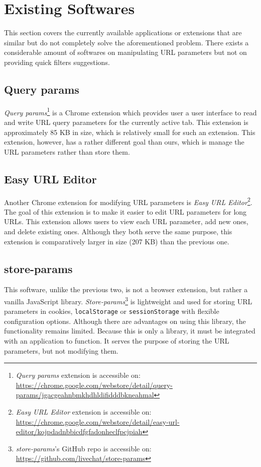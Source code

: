 \section{Existing Softwares}
This section covers the currently available applications or extensions that are similar but do not completely solve the aforementioned problem. There exists a considerable amount of softwares on manipulating URL parameters but not on providing quick filters suggestions.

\subsection*{Query params}
\emph{Query params}\footnote{\emph{Query params} extension is accessible on: \url{https://chrome.google.com/webstore/detail/query-params/jgacgeahnbmkhdhldifidddbkneahmal}} is a Chrome extension which provides user a user interface to read and write URL query parameters for the currently active tab. This extension is approximately 85 KB in size, which is relatively small for such an extension. This extension, however, has a rather different goal than ours, which is manage the URL parameters rather than store them.

\subsection*{Easy URL Editor}
Another Chrome extension for modifying URL parameters is \emph{Easy URL Editor}\footnote{\emph{Easy URL Editor} extension is accessible on: \url{https://chrome.google.com/webstore/detail/easy-url-editor/kojpdadnbbicdfgfadonheclfpcjpiah}}. The goal of this extension is to make it easier to edit URL parameters for long URLs. This extension allows users to view each URL parameter, add new ones, and delete existing ones. Although they both serve the same purpose, this extension is comparatively larger in size (207 KB) than the previous one.

\subsection*{store-params}
This software, unlike the previous two, is not a browser extension, but rather a vanilla JavaScript library. \emph{Store-params}\footnote{\emph{store-params}'s GitHub repo is accessible on: \url{https://github.com/livechat/store-params}} is lightweight and used for storing URL parameters in cookies, \texttt{localStorage} or \texttt{sessionStorage} with flexible configuration options. Although there are advantages on using this library, the functionality remains limited. Because this is only a library, it must be integrated with an application to function. It serves the purpose of storing the URL parameters, but not modifying them.

